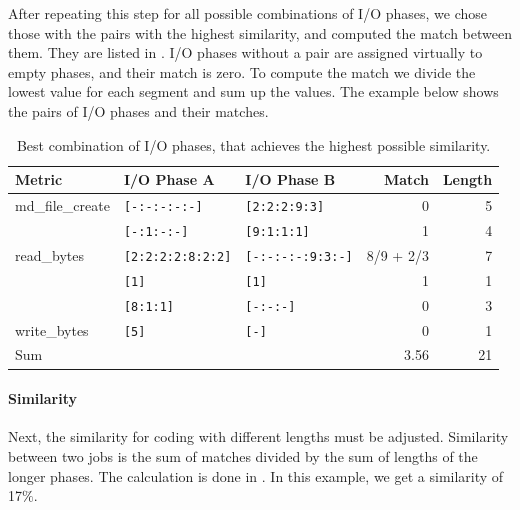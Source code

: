\documentclass{jhps}
\begin{document}
After repeating this step for all possible combinations of I/O phases, we chose those with the pairs with the highest similarity, and computed the match between them.
They are listed in .
I/O phases without a pair are assigned virtually to empty phases, and their match is zero.
To compute the match we divide the lowest value for each segment and sum up the values.
The example below shows the pairs of I/O phases and their matches.

\begin{table}
\centering
\begin{tabular}{lllrr}
	Metric           & I/O Phase A                 & I/O Phase B                 & Match     & Length \\
	\midrule
	md\_file\_create & \lstinline|[-:-:-:-:-]|     & \lstinline|[2:2:2:9:3]|     & 0         & 5      \\
	                 & \lstinline|[-:1:-:-]|       & \lstinline|[9:1:1:1]|       & 1         & 4      \\
	read\_bytes      & \lstinline|[2:2:2:2:8:2:2]| & \lstinline|[-:-:-:-:9:3:-]| & 8/9 + 2/3 & 7      \\
	                 & \lstinline|[1]|             & \lstinline|[1]|             & 1         & 1      \\
	                 & \lstinline|[8:1:1]|         & \lstinline|[-:-:-]|         & 0         & 3      \\
	write\_bytes     & \lstinline|[5]|             & \lstinline|[-]|             & 0         & 1      \\
	\midrule
	Sum              &                             &                             & 3.56      & 21     \\
\end{tabular}
\caption{Best combination of I/O phases, that achieves the highest possible similarity.}
\label{lst:pm_quant:phase_matching_example:matches}
\end{table}

\paragraph{Similarity}
Next, the similarity for coding with different lengths must be adjusted.
Similarity between two jobs is the sum of matches divided by the sum of lengths of the longer phases.
The calculation is done in .
In this example, we get a similarity of 17$\%$.
\end{document}

